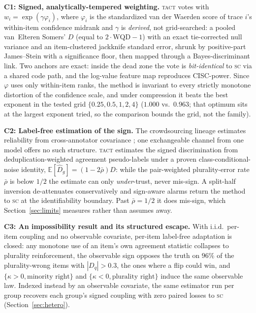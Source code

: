 \documentclass{article}
\newcommand{\Dhat}{\widehat{D}}
\newcommand{\SC}{\textsc{sc}}
\newcommand{\TACT}{\textsc{tact}}
\begin{document}
\textbf{C1: Signed, analytically-tempered weighting.} \TACT{} votes with
$w_i=\exp(\gamma\varphi_i)$, where $\varphi_i$ is the standardized van der
Waerden score of trace $i$'s within-item confidence midrank and $\gamma$ is
\emph{derived}, not grid-searched: a pooled van~Elteren Somers' $D$ (equal to
$2\cdot\mathrm{WQD}-1$) with an exact tie-corrected null variance and an
item-clustered jackknife standard error, shrunk by positive-part James--Stein
with a significance floor, then mapped through a Bayes-discriminant link. Two
anchors are exact: inside the dead zone the vote is \emph{bit-identical} to
\SC{} via a shared code path, and the log-value feature map reproduces
CISC-power. Since $\varphi$ uses only within-item ranks, the method is
invariant to every strictly monotone distortion of the confidence scale, and
under compression it beats the best exponent in the tested grid
$\{0.25,0.5,1,2,4\}$ ($1.000$ vs.\ $0.963$; that optimum sits at the largest
exponent tried, so the comparison bounds the grid, not the family).

\textbf{C2: Label-free estimation of the sign.} The crowdsourcing lineage
estimates reliability from cross-annotator covariance
\citep{dawid1979maximum,parisi2014ranking}; one exchangeable channel from one
model offers no such structure. \TACT{} estimates the signed discrimination
from deduplication-weighted agreement pseudo-labels under a proven
class-conditional-noise identity, $\mathbb{E}[\Dhat_g]=(1-2\bar\rho)D$: while
the pair-weighted plurality-error rate $\bar\rho$ is below $1/2$ the estimate
can only \emph{under}-trust, never mis-sign. A split-half inversion
de-attenuates conservatively and sign-aware alarms return the method to \SC{}
at the identifiability boundary. Past $\bar\rho=1/2$ it does mis-sign, which
Section~\ref{sec:limits} measures rather than assumes away.

\textbf{C3: An impossibility result and its structured escape.} With i.i.d.\
per-item coupling and no observable covariate, per-item label-free adaptation
is closed: any monotone use of an item's own agreement statistic collapses to
plurality reinforcement, the observable sign opposes the truth on $96\%$ of
the plurality-wrong items with $|D_q|>0.3$, the ones where a flip could win, and
$\{\kappa>0,\text{minority right}\}$ and $\{\kappa<0,\text{plurality right}\}$
induce the same observable law. Indexed instead by an observable covariate,
the same estimator run per group recovers each group's signed coupling with
zero paired losses to \SC{} (Section~\ref{sec:hetero}).
\end{document}

